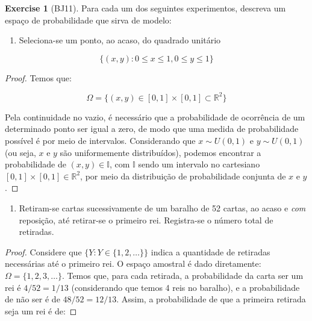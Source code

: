 \documentclass[
]{article}
\providecommand{\tightlist}{%
  \setlength{\itemsep}{0pt}\setlength{\parskip}{0pt}}
\theoremstyle{definition}
\theoremstyle{definition}
\theoremstyle{definition}
\newtheorem{exercise}{Exercise}[section]
\theoremstyle{definition}
\theoremstyle{remark}
\begin{document}
\begin{exercise}[BJ11]

Para cada um dos seguintes experimentos, descreva um espaço de probabilidade que sirva de modelo:

\begin{enumerate}
\def\labelenumi{\alph{enumi})}
\tightlist
\item
  Seleciona-se um ponto, ao acaso, do quadrado unitário
\end{enumerate}

\begin{equation*}
\{(x,y) : 0 \le x \le 1, 0 \le y \le 1\}
\end{equation*}

\begin{proof}
Temos que:

\begin{equation*}
\Omega = \{(x,y) \in [0,1] \times [0,1] \subset \mathbb{R}^{2}\}
\end{equation*}

Pela continuidade no vazio, é necessário que a probabilidade de ocorrência de um determinado ponto ser igual a zero, de modo que uma medida de probabilidade possível é por meio de intervalos. Considerando que \(x \sim U(0,1)\) e \(y \sim U(0,1)\) (ou seja, \(x\) e \(y\) são uniformemente distribuídos), podemos encontrar a probabilidade de \((x,y) \in \mathbb{I}\), com \(\mathbb{I}\) sendo um intervalo no cartesiano \([0,1] \times [0,1] \in \mathbb{R}^{2}\), por meio da distribuição de probabilidade conjunta de \(x\) e \(y\).
\end{proof}

\begin{enumerate}
\def\labelenumi{\alph{enumi})}
\setcounter{enumi}{1}
\tightlist
\item
  Retiram-se cartas sucessivamente de um baralho de 52 cartas, ao acaso e \emph{com} reposição, até retirar-se o primeiro rei. Registra-se o número total de retiradas.
\end{enumerate}

\begin{proof}
Considere que \(\{Y: Y \in \{1,2,\dots\}\}\) indica a quantidade de retiradas necessárias até o primeiro rei. O espaço amostral é dado diretamente: \(\Omega = \{1,2,3,\dots\}\). Temos que, para cada retirada, a probabilidade da carta ser um rei é \(4/52 = 1/13\) (considerando que temos 4 reis no baralho), e a probabilidade de não ser é de \(48/52 = 12/13\). Assim, a probabilidade de que a primeira retirada seja um rei é de:


\end{proof}
\end{exercise}
\end{document}
